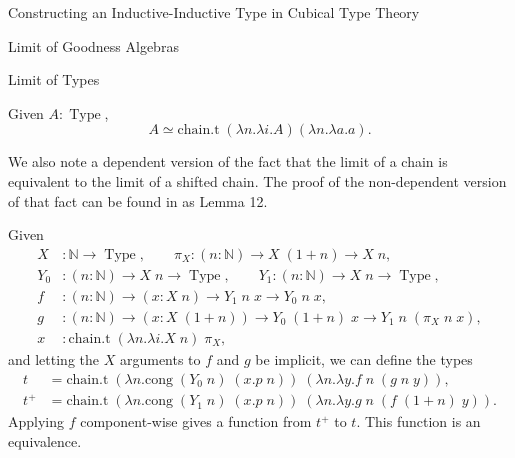 \documentclass[runningheads]{llncs}
\newcommand{\erase}[1]{{}}
\DeclareMathOperator{\USet}{Type}
\DeclareMathOperator{\Ix}{Ix}
\newcommand{\N}{\mathbb{N}}
\newcommand{\bbO}{\mathbb{O}}
\newcommand{\join}{\texttt{ext}}
\newcommand{\inj}{\texttt{inj}}
\begin{document}
\begin{section}{Constructing an Inductive-Inductive Type in Cubical Type Theory}
\begin{subsection}{Limit of Goodness Algebras}
\begin{subsubsection}{Limit of Types}
{        \begin{lemma}
            Given $A : \USet$, \[A \simeq \text{chain.t}\;(\lambda n.\lambda i.A)(\lambda n.\lambda a.a).\]
        \end{lemma}
    }
    
    We also note a dependent version of the fact that the limit of a chain is equivalent to the limit of a shifted chain. The proof of the non-dependent version of that fact can be found in \citet{nonwellfoundedtrees} as Lemma 12.
    
    \begin{lemma}
        Given \begin{align*}
        X &: \N \to \USet,\qquad
        \pi_X : (n : \N) \to X\;(1+n) \to X\;n,\\
        Y_0 &: (n : \N) \to X\;n \to \USet,\qquad
        Y_1 : (n : \N) \to X\;n \to \USet,\\
        f &: (n : \N) \to (x : X\;n) \to Y_1\;n\;x \to Y_0\;n\;x,\\
        g &: (n : \N) \to (x : X\;(1+n)) \to Y_0\;(1+n)\;x \to Y_1\;n\;(\pi_X\;n\;x),\\
        x &: \text{chain.t}\;(\lambda n.\lambda i.X\;n)\;\pi_X,
        \end{align*}
        and letting the $X$ arguments to $f$ and $g$ be implicit,
        we can define the types \begin{align*}t &= \text{chain.t}\;(\lambda n.\text{cong}\;(Y_0\;n)\;(x.p\;n))\;(\lambda n.\lambda y.f\;n\;(g\;n\;y)),\\t^+ &= \text{chain.t}\;(\lambda n.\text{cong}\;(Y_1\;n)\;(x.p\;n))\;(\lambda n.\lambda y.g\;n\;(f\;(1+n)\;y)).\end{align*}
        Applying $f$ component-wise gives a function from $t^+$ to $t$.
        This function is an equivalence.
    \end{lemma}
    
\end{subsubsection}


\erase{
We will proceed clause by clause, through $(L.A, L.B, L.\eta, L.\join, L.\inj)$.

\begin{subsubsection}{Defining $L.A$}
First, we define \[\Ix_\simeq.A : \Ix A\; L \simeq \text{chain.t}\;(\lambda n.\lambda i.\Ix A\;(S^n\;\bbO))\;(\lambda n.(\delta^\pi\;(S^n\;\bbO)).A)\] witnessing that $\Ix A$ commutes with chains by using Lemma \ref{limit-const-commute} with $\top$, since $\Ix A\;\delta^G = \top$ independent of $\delta^G$, and $(\delta^\pi\;(S^n\;\bbO)).A$ is the identity function.


\end{subsubsection}}
\end{subsection}
\end{section}
\end{document}
